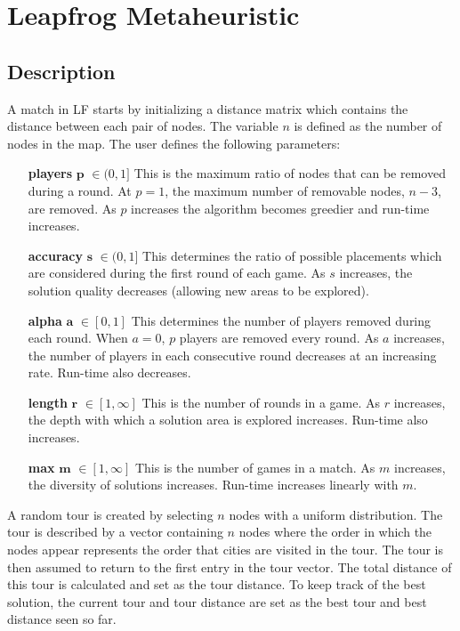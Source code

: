 \documentclass[12pt,letterpaper,oneside]{book}
\begin{document}
\chapter{Leapfrog Metaheuristic}
\section{Description}
A match in LF starts by initializing a distance matrix which contains the distance between each pair of nodes. The variable $ n $ is defined as the number of nodes in the map. The user defines the following parameters:
\begin{enumerate}[leftmargin=2.5cm]
	\item[\textbf{players} $ \boldsymbol{p} $] $ \in (0,1]$ This is the maximum ratio of nodes that can be removed during a round. At $ p=1 $, the maximum number of removable nodes, $ n-3 $, are removed. As $ p $ increases the algorithm becomes greedier and run-time increases.
	\item[\textbf{accuracy} $ \boldsymbol{s} $] $ \in (0,1]$ This determines the ratio of possible placements which are considered during the first round of each game. As $ s $ increases, the solution quality decreases (allowing new areas to be explored).
	\item[\textbf{alpha} $ \boldsymbol{a} $] $ \in [0,1]$ This determines the number of players removed during each round. When $ a=0 $, $ p $ players are removed every round. As $ a $ increases, the number of players in each consecutive round decreases at an increasing rate. Run-time also decreases.
	\item[\textbf{length} $ \boldsymbol{r} $] $ \in [1,\infty]$ This is the number of rounds in a game. As $ r $ increases, the depth with which a solution area is explored increases. Run-time also increases.
	\item[\textbf{max} $ \boldsymbol{m} $] $ \in [1,\infty]$ This is the number of games in a match. As $ m $ increases, the diversity of solutions increases. Run-time increases linearly with $ m $.
\end{enumerate}
	A random tour is created by selecting $ n $ nodes with a uniform distribution. The tour is described by a vector containing $ n $ nodes where the order in which the nodes appear represents the order that cities are visited in the tour. The tour is then assumed to return to the first entry in the tour vector. The total distance of this tour is calculated and set as the tour distance. To keep track of the best solution, the current tour and tour distance are set as the best tour and best distance seen so far.\\
\end{document}
